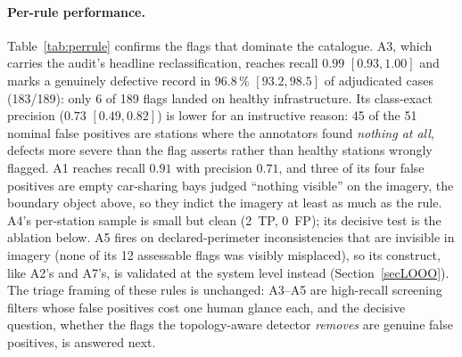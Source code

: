 \documentclass[11pt,a4paper]{article}
\begin{document}
\paragraph{Per-rule performance.}
Table~\ref{tab:perrule} confirms the flags that dominate the catalogue.
A3, which carries the audit's headline reclassification, reaches recall
$0.99$ $[0.93, 1.00]$ and marks a genuinely defective record in
$96.8\,\%$ $[93.2, 98.5]$ of adjudicated cases (183/189): only 6 of 189
flags landed on healthy infrastructure. Its class-exact precision
($0.73$ $[0.49, 0.82]$) is lower for an instructive reason: 45 of the 51
nominal false positives are stations where the annotators found
\emph{nothing at all}, defects more severe than the flag asserts rather
than healthy stations wrongly flagged. A1 reaches recall $0.91$ with
precision $0.71$, and three of its four false positives are empty
car-sharing bays judged ``nothing visible'' on the imagery, the boundary
object above, so they indict the imagery at least as much as the rule.
A4's per-station sample is small but clean (2~TP, 0~FP); its decisive
test is the ablation below. A5 fires on declared-perimeter
inconsistencies that are invisible in imagery (none of its 12 assessable
flags was visibly misplaced), so its construct, like A2's and A7's, is
validated at the system level instead (Section~\ref{secLOOO}). The triage
framing of these rules is unchanged: A3--A5 are high-recall screening
filters whose false positives cost one human glance each, and the
decisive question, whether the flags the topology-aware detector
\emph{removes} are genuine false positives, is answered next.
\end{document}
